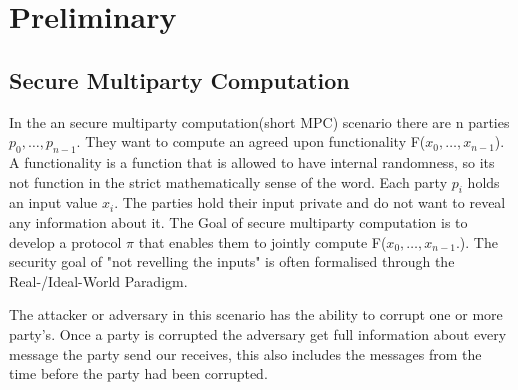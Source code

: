 \chapter{Preliminary}
\section{Secure Multiparty Computation}
In the an secure multiparty computation(short MPC) scenario there are n parties $ p_0,\dots,p_{n-1} $. They want to compute an agreed upon functionality F($ x_0,\dots,x_{n-1} $). A functionality is a function that is allowed to have internal randomness, so its not function in the strict mathematically sense of the word. 
Each party $ p_i $ holds an input value $ x_i $. 
The parties hold their input private and do not want to reveal any information about it. The Goal of secure multiparty computation is to develop a protocol  $ \pi $ that enables them to jointly compute F($ x_0,\dots,x_{n-1}. $). The security goal of "not revelling the inputs" is often formalised through the Real-/Ideal-World Paradigm. 





The attacker or adversary in this scenario has the ability to corrupt one or more party's. 
Once a party is corrupted the adversary get full information about every message the party send our receives, this also includes the messages from the time before the party had been corrupted.    


